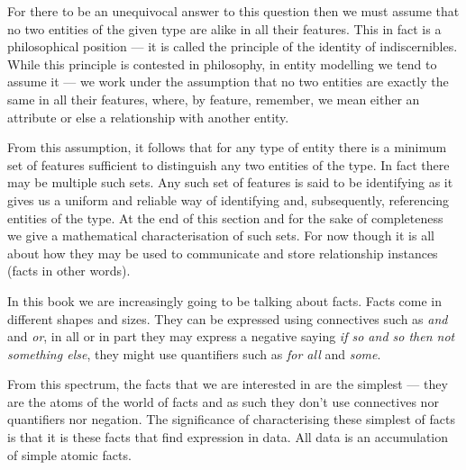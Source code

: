 For there to be an unequivocal answer to this question then we must assume that no two entities of the given type are alike in all their features. This in fact  is a philosophical position 
--- it is called the principle of the identity of indiscernibles. 
While this principle is contested in philosophy, in entity modelling we tend to assume it --- we work under the assumption that no two entities are exactly the same in all their features, where, by feature, remember, we mean either an attribute or else a relationship with another entity. 

From this assumption, it follows that for any type of entity there is a minimum set of features sufficient to distinguish any two entities of the type. In fact there may be multiple such sets. 
Any such set of features is said to be identifying as it gives us 
a uniform and reliable way of identifying and, subsequently, referencing entities of the type. At the end of this section and for the sake of completeness we give a mathematical characterisation of such sets. For now though it is all about how they may be used to communicate and store relationship instances (facts in  other words).

\begin{notebox}
In this book we are increasingly going to be talking about facts. Facts come in different shapes and sizes. 
They can be expressed using connectives such as \textit{and} and \textit{or}, 
in all or in part they may express a negative saying \textit{if so and so then not something else}, they might use
quantifiers such as  \textit{for all} and \textit{some}.
  
From this spectrum, the facts that we are interested in are the simplest --- they are the atoms of the world of facts and as such they don't use connectives nor quantifiers nor negation. 
The significance of characterising these simplest of facts is that 
it is these facts that find expression in data. All data is an accumulation of simple atomic facts.  
\end{notebox}
